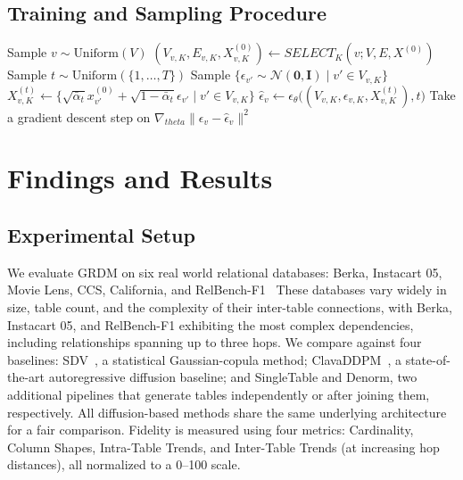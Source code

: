 \documentclass[manuscript,review]{acmart}
\begin{document}
\subsection{Training and Sampling Procedure}
\begin{algorithm}
    \caption{Training}
    \label{alg:training}
    \begin{algorithmic}[1]
        \REPEAT
        \STATE Sample $v \sim \text{Uniform}(V)$
        \STATE $(V_{v,K}, E_{v,K}, X_{v,K}^{(0)}) \leftarrow SELECT_K(v;V,E,X^{(0)})$ 
        \STATE Sample $t \sim \text{Uniform}(\{1,\dots,T\})$
        \STATE Sample $\{\epsilon_{v'} \sim \mathcal{N}(\mathbf{0}, \mathbf{I}) \mid v' \in V_{v,K}\}$
        \STATE $X_{v,K}^{(t)} \leftarrow \{\sqrt{\bar\alpha_t}x_{v'}^{(0)} + \sqrt{1-\bar\alpha_t}\epsilon_{v'} \mid v' \in V_{v,K} \}$
        \STATE $\hat\epsilon_v \leftarrow \epsilon_\theta\big((V_{v,K},\epsilon_{v,K},X_{v,K}^{(t)}),t\big)$
        \STATE Take a gradient descent step on $\nabla_{theta} \|\epsilon_v - \hat\epsilon_v\|^2$
    \end{algorithmic}
\end{algorithm}



\section{Findings and Results}
\subsection{Experimental Setup}
We evaluate GRDM on six real world relational databases: Berka, Instacart 05, Movie Lens, CCS, California, and RelBench-F1~\cite{wang20244dbinfer4dbenchmarkingtoolbox} These databases vary widely in size, table count, and the complexity of their
inter-table connections, with Berka, Instacart 05, and RelBench-F1 exhibiting the most complex dependencies, including relationships spanning up to three hops. We compare against four baselines: SDV~\cite{7796926}, a statistical Gaussian-copula method; ClavaDDPM~\cite{NEURIPS2024_98387657}, a state-of-the-art autoregressive diffusion baseline; and SingleTable and Denorm, two additional pipelines that generate tables independently or after joining them, respectively. All diffusion-based methods share the same underlying architecture for a fair comparison. Fidelity is measured using four metrics: Cardinality, Column Shapes, Intra-Table Trends, and Inter-Table Trends (at increasing hop distances), all normalized to a 0--100 scale.
\end{document}
